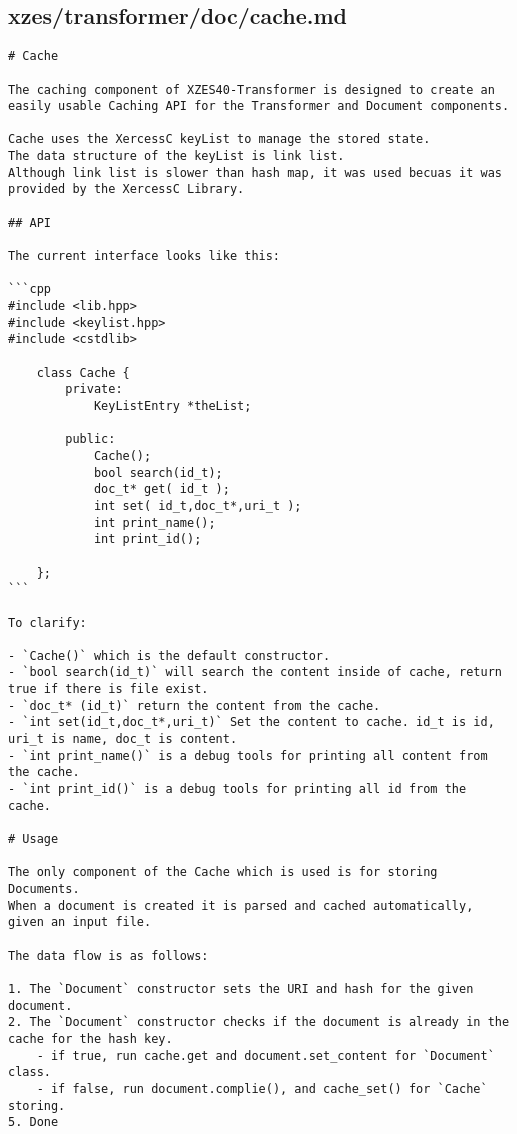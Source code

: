 \subsection{xzes/transformer/doc/cache.md}
\begin{lstlisting}[caption={Documentation about the caching code.}]
# Cache

The caching component of XZES40-Transformer is designed to create an easily usable Caching API for the Transformer and Document components.

Cache uses the XercessC keyList to manage the stored state.
The data structure of the keyList is link list.
Although link list is slower than hash map, it was used becuas it was provided by the XercessC Library.

## API

The current interface looks like this:

```cpp
#include <lib.hpp>
#include <keylist.hpp>
#include <cstdlib>

	class Cache {
        private:
        	KeyListEntry *theList;

        public:
        	Cache();
            bool search(id_t);
            doc_t* get( id_t );
            int set( id_t,doc_t*,uri_t );
            int print_name();
            int	print_id();

    };
```

To clarify:

- `Cache()` which is the default constructor.
- `bool search(id_t)` will search the content inside of cache, return true if there is file exist.
- `doc_t* (id_t)` return the content from the cache.
- `int set(id_t,doc_t*,uri_t)` Set the content to cache. id_t is id, uri_t is name, doc_t is content.
- `int print_name()` is a debug tools for printing all content from the cache.
- `int print_id()` is a debug tools for printing all id from the cache.

# Usage

The only component of the Cache which is used is for storing Documents.
When a document is created it is parsed and cached automatically, given an input file.

The data flow is as follows:

1. The `Document` constructor sets the URI and hash for the given document.
2. The `Document` constructor checks if the document is already in the cache for the hash key.
    - if true, run cache.get and document.set_content for `Document` class.
    - if false, run document.complie(), and cache_set() for `Cache` storing.
5. Done
\end{lstlisting}

